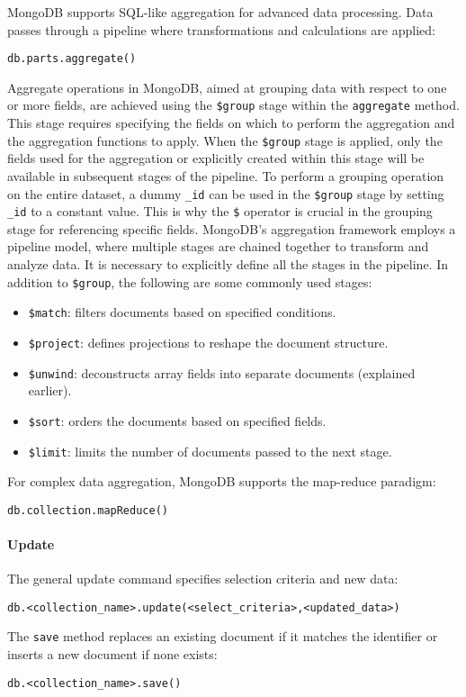 MongoDB supports SQL-like aggregation for advanced data processing. 
Data passes through a pipeline where transformations and calculations are applied:
\begin{lstlisting}[style=MongoDB]
db.parts.aggregate()
\end{lstlisting}
Aggregate operations in MongoDB, aimed at grouping data with respect to one or more fields, are achieved using the \texttt{\$group} stage within the \texttt{aggregate} method.
This stage requires specifying the fields on which to perform the aggregation and the aggregation functions to apply. 
When the \texttt{\$group} stage is applied, only the fields used for the aggregation or explicitly created within this stage will be available in subsequent stages of the pipeline. 
To perform a grouping operation on the entire dataset, a dummy \texttt{\_id} can be used in the \texttt{\$group} stage by setting \texttt{\_id} to a constant value. 
This is why the \texttt{\$} operator is crucial in the grouping stage for referencing specific fields.
MongoDB's aggregation framework employs a pipeline model, where multiple stages are chained together to transform and analyze data. 
It is necessary to explicitly define all the stages in the pipeline. 
In addition to \texttt{\$group}, the following are some commonly used stages:
\begin{itemize}
    \item \texttt{\$match}: filters documents based on specified conditions.
    \item \texttt{\$project}: defines projections to reshape the document structure.
    \item \texttt{\$unwind}: deconstructs array fields into separate documents (explained earlier).
    \item \texttt{\$sort}: orders the documents based on specified fields.
    \item \texttt{\$limit}: limits the number of documents passed to the next stage.
\end{itemize}
\noindent For complex data aggregation, MongoDB supports the map-reduce paradigm:
\begin{lstlisting}[style=MongoDB]
db.collection.mapReduce()
\end{lstlisting}

\paragraph*{Update}
The general update command specifies selection criteria and new data:
\begin{lstlisting}[style=MongoDB]
db.<collection_name>.update(<select_criteria>,<updated_data>)
\end{lstlisting}
The \texttt{save} method replaces an existing document if it matches the identifier or inserts a new document if none exists:
\begin{lstlisting}[style=MongoDB]
db.<collection_name>.save()
\end{lstlisting}

